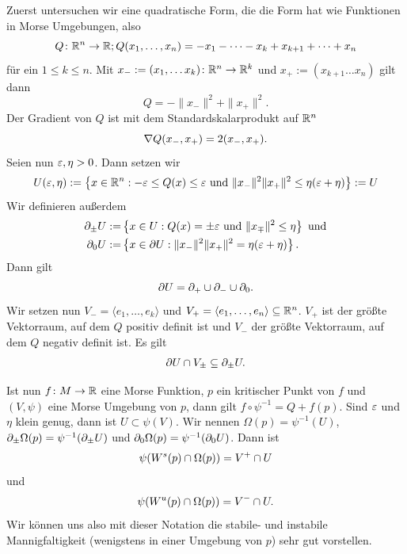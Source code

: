 \begin{definition}
    \label{def: notation morse umgebung}
    Zuerst untersuchen wir eine quadratische Form, die die Form hat wie Funktionen in Morse
    Umgebungen, also
    \[ Q \colon { \mathbb R }^n \to { \mathbb R } ; Q(x_1, \dots, x_n) = - x_1 - \dots - x_k + x_{k + 1} + \dots + x_n \]
    für ein $1 \leq k \leq n$.
    Mit $x_- := (x_1, \dots x_k) \colon { \mathbb R }^n \to { \mathbb R }^k$ und $x_+ := (x_{k + 1} \dots x_n)$ gilt dann
    \[ Q = - \| x_- \|^2 + \| x_+ \|^2 . \]
    Der Gradient von $Q$ ist mit dem Standardskalarprodukt auf ${ \mathbb R }^n$
    \[ { \nabla } Q (x_-, x_+) = 2(x_-, x_+) . \]
    Seien nun $\varepsilon, \eta > 0$. Dann setzen wir
    \[ U(\varepsilon, \eta) := \left\{ x \in { \mathbb R }^n : - \varepsilon \leq Q(x) \leq \varepsilon 
    \text{ und } \| x_- \|^2 \| x_+ \|^2 \leq \eta(\varepsilon + \eta) \right\} := U \]
    Wir definieren außerdem
    \begin{align*}
        { \partial }_{\pm} U := & \left\{ x \in U: Q(x) = \pm \varepsilon \text{ und } \|x_{\mp} \|^2 \leq \eta \right\} 
            \text{ und} \\
        { \partial }_0 U := & \left\{ x \in { \partial } U: \| x_- \|^2 \| x_+ \|^2 = \eta(\varepsilon + \eta) \right\} .
    \end{align*}
    Dann gilt 
    \[ { \partial } U = { \partial }_+ \cup { \partial }_- \cup { \partial }_0 . \]
    Wir setzen nun $V_- = \langle e_1, \dots, e_k \rangle$ und 
    $V_+ = \langle e_1, \dots, e_n \rangle \subseteq { \mathbb R }^n$. $V_+$ ist der größte Vektorraum, 
    auf dem $Q$ positiv definit ist und $V_-$ der größte Vektorraum, auf dem $Q$ negativ definit ist. 
    Es gilt 
    \[ { \partial } U \cap V_{\pm} \subseteq { \partial }_{\pm} U . \]

    Ist nun $f \colon M \to { \mathbb R }$ eine Morse Funktion, $p$ ein kritischer Punkt von $f$ und $(V, \psi)$
    eine Morse Umgebung von $p$, dann gilt $f \circ \psi^{-1} = Q + f(p)$. Sind $\varepsilon$ und $\eta$
    klein genug, dann ist $U \subset \psi(V)$. Wir nennen $\Omega (p) = \psi^{-1}(U)$,
    ${ \partial }_{\pm} \Omega (p) = \psi^{-1}({ \partial }_{\pm}U)$ und ${ \partial }_0 \Omega (p) = \psi^{-1} ({ \partial }_0 U)$.
    Dann ist 
    \[ \psi({ W^s } (p) \cap \Omega (p)) = V^+ \cap U \] 
    und 
    \[ \psi({ W^u } (p) \cap \Omega (p)) = V^- \cap U . \]
    Wir können uns also mit dieser Notation die stabile- und instabile Mannigfaltigkeit (wenigstens 
    in einer Umgebung von $p$) sehr gut vorstellen.


\end{definition}
